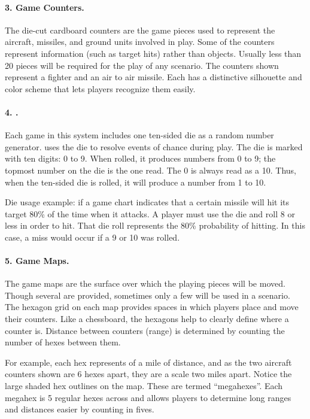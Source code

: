 \paragraph{3. Game Counters.} The die-cut cardboard counters are the game pieces used to represent the aircraft, missiles, and ground units involved in play. Some of the counters represent information (such as target hits) rather than objects. Usually less than 20 pieces will be required for the play of any scenario. The counters shown  represent a fighter and an air to air missile. Each has a distinctive silhouette and color scheme that lets players recognize them easily.



\paragraph{4. \protect{}.} Each game in this system includes one ten-sided die as a random number generator. {\AirPow} uses the die to resolve events of chance during play. The die is marked with ten digits: 0 to 9. When rolled, it produces numbers from 0 to 9; the topmost number on the die is the one read. The 0 is always read as a 10. Thus, when the ten-sided die is rolled, it will produce a number from 1 to 10.

Die usage example: if a game chart indicates that a certain missile will hit its target 80\% of the time when it attacks. A player must use the die and roll 8 or less in order to hit. That die roll represents the 80\% probability of hitting. In this case, a miss would occur if a 9 or 10 was rolled.

\paragraph{5. Game Maps.} The game maps are the surface over which the playing pieces will be moved. Though several are provided, sometimes only a few will be used in a scenario. The hexagon grid on each map provides spaces in which players place and move their counters. Like a chessboard, the hexagons help to clearly define where a counter is. Distance between counters (range) is determined by counting the number of hexes between them. 

For example,  each hex represents {\onethird} of a mile of distance, and as the two aircraft counters shown are 6 hexes apart, they are a scale two miles apart. 
Notice the large shaded hex outlines on the map. These are termed “megahexes”. Each megahex is 5 regular hexes across and allows players to determine long ranges and distances easier by counting in fives. 


